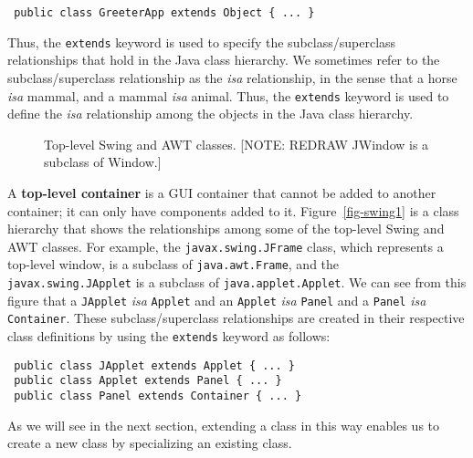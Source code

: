 \begin{jjjlisting}
\begin{lstlisting}
 public class GreeterApp extends Object { ... }
\end{lstlisting}
\end{jjjlisting}

\noindent Thus, the {\tt extends} keyword is used to specify the
subclass/superclass relationships that hold in the Java class
hierarchy.  We sometimes refer to the subclass/superclass relationship
as the {\em isa} relationship, in the sense that a horse {\em isa}
mammal, and a mammal {\em isa} animal. Thus, the {\tt extends} keyword
is used to define the {\em isa} relationship among the objects in the
Java class hierarchy.

\begin{figure}[tb]
{Top-level Swing and AWT classes. [NOTE: REDRAW JWindow
is a subclass of Window.]
\label{fig-swing1}
\label{pg-fig-swing1}}
\end{figure}

A {\bf top-level container} is a GUI container that cannot be added to
another container; it can only have components added to it.
Figure~\ref{fig-swing1} is a class hierarchy that shows the
relationships among some of the top-level Swing and AWT classes.  For
example, the {\tt javax.swing.JFrame} class, which represents a
top-level window, is a subclass of {\tt java.awt.Frame}, and the {\tt
javax.swing.JApplet} is a subclass of {\tt java.applet.Applet}.  We
can see from this figure that a {\tt JApplet} {\it isa} {\tt Applet}
and an {\tt Applet} {\it isa} {\tt Panel} and a {\tt Panel} {\it isa}
{\tt Container}.  These subclass/superclass relationships are created
in their respective class definitions by using the {\tt extends}
keyword as follows:

\begin{jjjlisting}
\begin{lstlisting}
 public class JApplet extends Applet { ... }
 public class Applet extends Panel { ... }
 public class Panel extends Container { ... }
\end{lstlisting}
\end{jjjlisting}

\noindent As we will see in the next section, extending a class in this way
enables us to create a new class by specializing an existing class.

